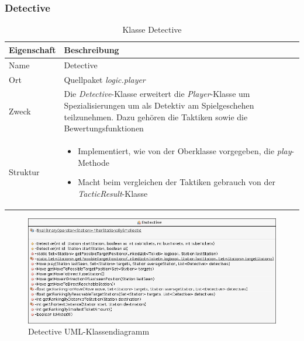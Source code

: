     \subsubsection{Detective}
        \begin{table}[H]
            \caption{Klasse Detective}
            \begin{tabular}{p{2.5cm}  p{9.5cm}} 
                \hline
                \textbf{Eigenschaft} & \textbf{Beschreibung}\\
                \hline
                Name & Detective\\
                Ort & Quellpaket \textit{logic.player}\\
                \hline
                Zweck &
                Die \textit{Detective}-Klasse erweitert die \textit{Player}-Klasse um Spezialisierungen um als Detektiv am Spielgeschehen teilzunehmen.
                Dazu gehören die Taktiken sowie die Bewertungsfunktionen
                \\
                \hline
                Struktur &
                \begin{itemize}
                    \itemsep0em
                    \item Implementiert, wie von der Oberklasse vorgegeben, die \textit{play}-Methode
                    \item Macht beim vergleichen der Taktiken gebrauch von der \textit{TacticResult}-Klasse
                \end{itemize}
                \\
                \hline
            \end{tabular}
        \end{table}
        \begin{figure}[H]
            \centering
            \includegraphics[scale=0.4]{img/uml/detective.png}   
            \caption{Detective UML-Klassendiagramm}
        \end{figure}


